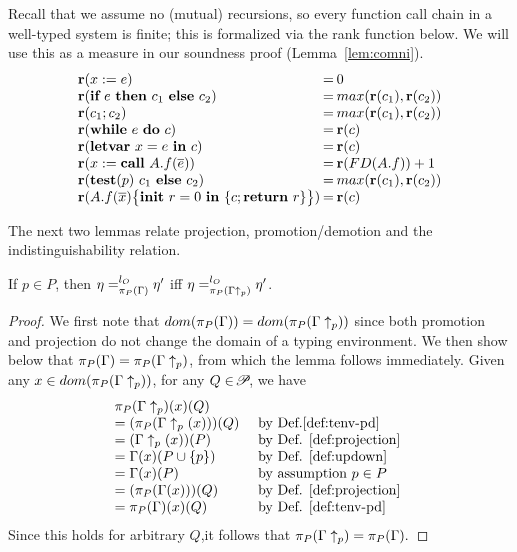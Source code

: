 {{{Recall that we assume no (mutual) recursions, so every function call
chain in a well-typed system is finite; this is formalized via the rank function below. We will use this
as a measure in our soundness proof (Lemma~\ref{lem:comni}).
\begin{equation*}
\arraycolsep=1.0pt\def\arraystretch{1}
\begin{array}{lcl}
\rank{\lcASS{x}{e}} & = &0\\
\rank{\lcIF{e}{c_1}{c_2}} & = &max(\rank{c_1}, \rank{c_2)}\\
\rank{\lcSEQ{c_1}{c_2}} & = &max(\rank{c_1}, \rank{c_2})\\
\rank{\lcWHILE{e}{c}} & = &\rank{c} \\
\rank{\lcLETVAR{x}{e}{c}} & = &\rank{c} \\
\rank{\lcCALL{x}{A.f}{\overline{e}}} & = &
   \rank{FD(A.f)} + 1\\
\rank{\lcCP{p}{c_1}{c_2}} & = & max(\rank{c_1}, \rank{c_2})\\
\rank{\lpFUN{A.f}{\overline x}{c}} &=& \rank{c}
\end{array}
\end{equation*}


The next two lemmas relate projection, promotion/demotion
and the indistinguishability relation.

\begin{lemma}\label{lem:up}
If $p \in P$, then $\eta =_{\app{\Gamma}{P}}^{l_{O}} \eta'$ iff $\eta =_{\app{\Gamma\uparrow_{p}}{P}}^{l_{O}} \eta'$.
\end{lemma}
\begin{proof}
  We first note that $dom(\app{\Gamma}{P}) = dom(\app{\Gamma\uparrow_{p}}{P})$ since both
  promotion and projection do not change the domain of a typing environment.
  We then show below that $\app{\Gamma}{P} = \app{\Gamma\uparrow_p}{P}$, from which the
  lemma follows immediately.
  Given any $x \in dom(\app{\Gamma\uparrow_{p}}{P})$,
  for any $Q \in \PPS$, we have
  $$
  \begin{array}{ll}
    \app{\Gamma\uparrow_p}{P}(x)(Q) & \\
    = (\app{\Gamma\uparrow_p(x)}{P})(Q) & \mbox{ by Def.\ref{def:tenv-pd} }\\
    = (\Gamma\uparrow_p(x))(P) & \mbox{ by Def. \ref{def:projection} }\\
    = \Gamma(x)(P \cup \{p\}) & \mbox { by Def. \ref{def:updown} } \\
    = \Gamma(x)(P) & \mbox{ by assumption $p \in P$ }\\
    = (\app{\Gamma(x)}{P})(Q) & \mbox{ by Def. \ref{def:projection} }\\
    = \app{\Gamma}{P}(x)(Q) & \mbox{ by Def. \ref{def:tenv-pd} }
  \end{array}
  $$
  Since this holds for arbitrary $Q$,it follows that $\app{\Gamma\uparrow_p}{P} = \app{\Gamma}{P}.$
\end{proof}

}}}
